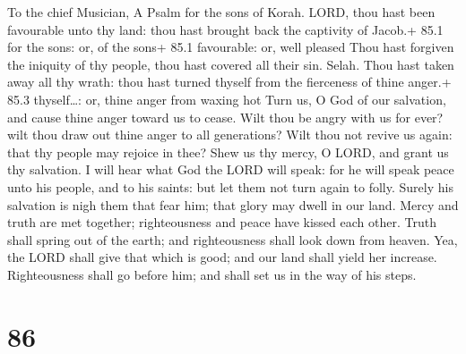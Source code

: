 To the chief Musician, A Psalm for the sons of Korah.  LORD,
thou hast been favourable unto thy land: thou hast brought back the
captivity of Jacob.+ 85.1 for the sons: or, of the sons+ 85.1
favourable: or, well pleased  Thou hast forgiven the
iniquity of thy people, thou hast covered all their sin. Selah.
 Thou hast taken away all thy wrath: thou hast turned
thyself from the fierceness of thine anger.+ 85.3 thyself\ldots: or,
thine anger from waxing hot  Turn us, O God of our
salvation, and cause thine anger toward us to cease.  Wilt
thou be angry with us for ever? wilt thou draw out thine anger to all
generations?  Wilt thou not revive us again: that thy people
may rejoice in thee?  Shew us thy mercy, O LORD, and grant
us thy salvation.  I will hear what God the LORD will speak:
for he will speak peace unto his people, and to his saints: but let them
not turn again to folly.  Surely his salvation is nigh them
that fear him; that glory may dwell in our land.  Mercy and
truth are met together; righteousness and peace have kissed each other.
 Truth shall spring out of the earth; and righteousness
shall look down from heaven.  Yea, the LORD shall give that
which is good; and our land shall yield her increase. 
Righteousness shall go before him; and shall set us in the way of his
steps.

\hypertarget{section-85}{%
\section{86}\label{section-85}}

